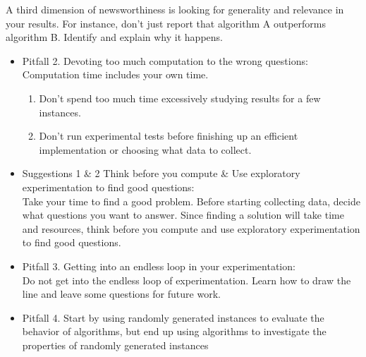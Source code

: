 \documentclass[]{scrartcl}
\begin{document}
A third dimension of newsworthiness is looking for generality and relevance in your results. For instance, don't just report that algorithm A outperforms algorithm B. Identify and explain why it happens.
\begin{itemize}
	\item Pitfall 2. Devoting too much computation to the wrong questions: \\
	Computation time includes your own time. 
	\begin{enumerate}
		\item Don't spend too much time excessively studying results for a few instances.
		\item Don't run experimental tests before finishing up an efficient implementation or choosing what data to collect.
	\end{enumerate}
\end{itemize}
\begin{itemize}
	\item Suggestions 1 \& 2 Think before you compute \& Use exploratory experimentation to find good questions: \\
	Take your time to find a good problem. Before starting collecting data, decide what questions you want to answer. Since finding a solution will take time and resources, think before you compute and use exploratory experimentation to find good questions.
\end{itemize}
\begin{itemize}
	\item Pitfall 3. Getting into an endless loop in your experimentation: \\
	Do not get into the endless loop of experimentation. Learn how to draw the line and leave some questions for future work.
	\item Pitfall 4. Start by using randomly generated instances to evaluate the behavior of algorithms, but end up using algorithms to investigate the properties of randomly generated instances
\end{itemize}
\end{document}
